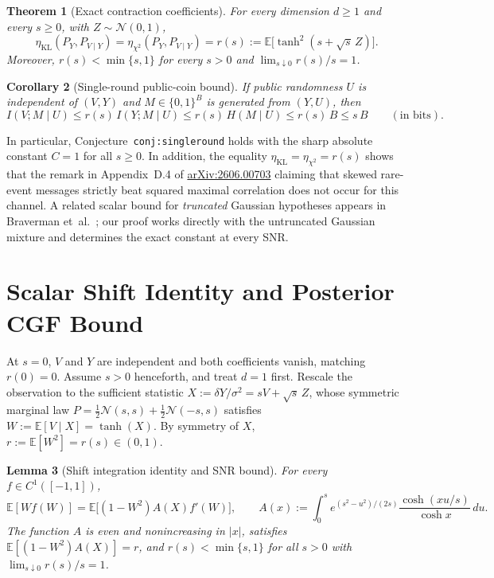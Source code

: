 \documentclass[11pt]{article}
\theoremstyle{plain}
\newtheorem{theorem}{Theorem}
\newtheorem{lemma}[theorem]{Lemma}
\newtheorem{corollary}[theorem]{Corollary}
\theoremstyle{definition}
\theoremstyle{remark}
\begin{document}
\begin{theorem}[Exact contraction coefficients]\label{thm:main}
For every dimension $d \ge 1$ and every $s \ge 0$, with $Z \sim \mathcal{N}(0, 1)$,
\begin{equation}\label{eq:exact-eta}
\eta_{\mathrm{KL}}(P_Y, P_{V \mid Y})
= \eta_{\chi^2}(P_Y, P_{V \mid Y})
= r(s) := \mathbb{E}\bigl[\tanh^2(s + \sqrt{s}\,Z)\bigr].
\end{equation}
Moreover, $r(s) < \min\{s, 1\}$ for every $s > 0$ and $\lim_{s \downarrow 0} r(s)/s = 1$.
\end{theorem}

\begin{corollary}[Single-round public-coin bound]\label{cor:public-coin}
If public randomness $U$ is independent of $(V, Y)$ and $M \in \{0, 1\}^B$ is generated from $(Y, U)$, then
\[
I(V; M \mid U) \le r(s)\, I(Y; M \mid U) \le r(s)\, H(M \mid U) \le r(s)\, B \le s\, B \qquad (\text{in bits}).
\]
\end{corollary}

In particular, Conjecture~\texttt{conj:singleround} holds with the sharp absolute constant $C = 1$ for all $s \ge 0$.
In addition, the equality $\eta_{\mathrm{KL}} = \eta_{\chi^2} = r(s)$ shows that the remark in Appendix~D.4 of \href{https://arxiv.org/abs/2606.00703}{arXiv:2606.00703} claiming that skewed rare-event messages strictly beat squared maximal correlation does not occur for this channel.
A related scalar bound for \emph{truncated} Gaussian hypotheses appears in Braverman et~al.~\cite{braverman2016ddpi}; our proof works directly with the untruncated Gaussian mixture and determines the exact constant at every SNR.

\section{Scalar Shift Identity and Posterior CGF Bound}

At $s = 0$, $V$ and $Y$ are independent and both coefficients vanish, matching $r(0) = 0$. Assume $s > 0$ henceforth, and treat $d = 1$ first.
Rescale the observation to the sufficient statistic $X := \delta Y / \sigma^2 = s V + \sqrt{s}\, Z$, whose symmetric marginal law $P = \frac{1}{2}\mathcal{N}(s, s) + \frac{1}{2}\mathcal{N}(-s, s)$ satisfies $W := \mathbb{E}[V \mid X] = \tanh(X)$. By symmetry of $X$, $r := \mathbb{E}[W^2] = r(s) \in (0, 1)$.

\begin{lemma}[Shift integration identity and SNR bound]\label{lem:shift}
For every $f \in C^1([-1, 1])$,
\begin{equation}\label{eq:shift}
\mathbb{E}[W f(W)] = \mathbb{E}\bigl[(1 - W^2) A(X) f'(W)\bigr],
\qquad
A(x) := \int_0^s e^{(s^2 - u^2)/(2s)} \frac{\cosh(xu/s)}{\cosh x}\,du.
\end{equation}
The function $A$ is even and nonincreasing in $|x|$, satisfies $\mathbb{E}[(1 - W^2)A(X)] = r$, and $r(s) < \min\{s, 1\}$ for all $s > 0$ with $\lim_{s \downarrow 0} r(s)/s = 1$.
\end{lemma}
\end{document}
